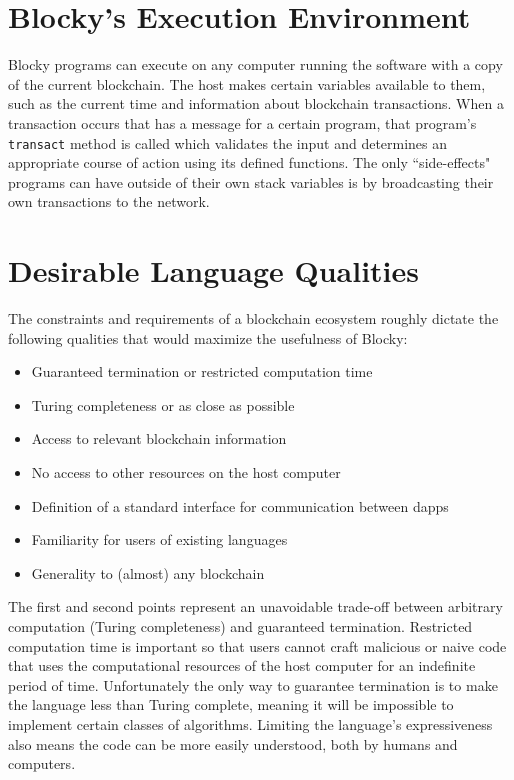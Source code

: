 \documentclass[letterpaper]{article}
\begin{document}
\section{Blocky's Execution Environment}

Blocky programs can execute on any computer running the software with a copy of the current blockchain. The host makes certain variables available to them, such as the current time and information about blockchain transactions. When a transaction occurs that has a message for a certain program, that program's \texttt{transact} method is called which validates the input and determines an appropriate course of action using its defined functions. The only ``side-effects" programs can have outside of their own stack variables is by broadcasting their own transactions to the network.

\section{Desirable Language Qualities}

The constraints and requirements of a blockchain ecosystem roughly dictate the following qualities that would maximize the usefulness of Blocky:
\begin{itemize}
  \item{Guaranteed termination or restricted computation time}
  \item{Turing completeness or as close as possible}
  \item{Access to relevant blockchain information}
  \item{No access to other resources on the host computer}
  \item{Definition of a standard interface for communication between dapps}
  \item{Familiarity for users of existing languages}
  \item{Generality to (almost) any blockchain}
\end{itemize}

The first and second points represent an unavoidable trade-off between arbitrary computation (Turing completeness) and guaranteed termination. Restricted computation time is important so that users cannot craft malicious or naive code that uses the computational resources of the host computer for an indefinite period of time. Unfortunately the only way to guarantee termination is to make the language less than Turing complete, meaning it will be impossible to implement certain classes of algorithms\cite{turing37}. Limiting the language's expressiveness also means the code can be more easily understood, both by humans and computers\cite{plant15}.
\end{document}
